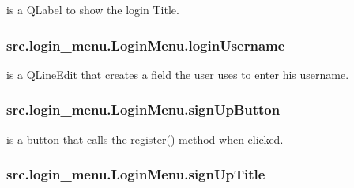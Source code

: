 is a Q\+Label to show the login Title. 

\hypertarget{classsrc_1_1login__menu_1_1_login_menu_a762640516f0435f5764308fd0f00a6c9}{}
\subsubsection[{login\+Username}]{\setlength{\rightskip}{0pt plus 5cm}src.\+login\+\_\+menu.\+Login\+Menu.\+login\+Username}\label{classsrc_1_1login__menu_1_1_login_menu_a762640516f0435f5764308fd0f00a6c9}


is a Q\+Line\+Edit that creates a field the user uses to enter his username. 

\hypertarget{classsrc_1_1login__menu_1_1_login_menu_a2d518012477c43a0d5b77385e2e4209f}{}
\subsubsection[{sign\+Up\+Button}]{\setlength{\rightskip}{0pt plus 5cm}src.\+login\+\_\+menu.\+Login\+Menu.\+sign\+Up\+Button}\label{classsrc_1_1login__menu_1_1_login_menu_a2d518012477c43a0d5b77385e2e4209f}


is a button that calls the \hyperlink{classsrc_1_1login__menu_1_1_login_menu_af6ee6a8dee90f1a94a506400356707ad}{register()} method when clicked. 

\hypertarget{classsrc_1_1login__menu_1_1_login_menu_a07a65e6211f15b49d6e6abc0daac320b}{}
\subsubsection[{sign\+Up\+Title}]{\setlength{\rightskip}{0pt plus 5cm}src.\+login\+\_\+menu.\+Login\+Menu.\+sign\+Up\+Title}\label{classsrc_1_1login__menu_1_1_login_menu_a07a65e6211f15b49d6e6abc0daac320b}


